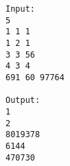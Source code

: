\begin{verbatim}
Input:
5
1 1 1
1 2 1
3 3 56
4 3 4
691 60 97764

Output:
1
2
8019378
6144
470730 
\end{verbatim}